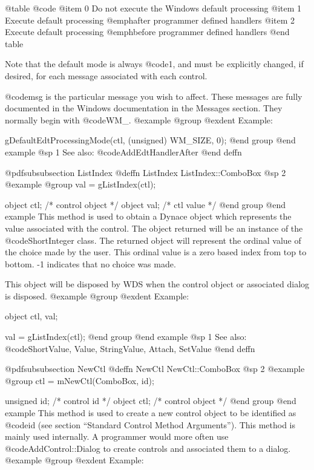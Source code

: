 @table @code
@item 0
Do not execute the Windows default processing
@item 1
Execute default processing @emph{after} programmer defined handlers
@item 2
Execute default processing @emph{before} programmer defined handlers
@end table

Note that the default mode is always @code{1}, and must be explicitly
changed, if desired, for each message associated with each control.

@code{msg} is the particular message you wish to affect.  These messages
are fully documented in the Windows documentation in the Messages
section.  They normally begin with @code{WM_}.
@example
@group
@exdent Example:

gDefaultEdtProcessingMode(ctl, (unsigned) WM_SIZE, 0);
@end group
@end example
@sp 1
See also:  @code{AddEdtHandlerAfter}
@end deffn

















@pdfsubsubsection {ListIndex}
@deffn {ListIndex} ListIndex::ComboBox
@sp 2
@example
@group
val = gListIndex(ctl);

object  ctl;   /*  control object  */
object  val;   /*  ctl value       */
@end group
@end example
This method is used to obtain a Dynace object which represents the value
associated with the control.  The object returned will be an instance of
the @code{ShortInteger} class.  The returned object will represent the
ordinal value of the choice made by the user.  This ordinal value is a
zero based index from top to bottom.  -1 indicates that no choice was
made.

This object will be disposed by WDS when the control object or
associated dialog is disposed.
@example
@group
@exdent Example:

object  ctl, val;

val = gListIndex(ctl);
@end group
@end example
@sp 1
See also:  @code{ShortValue, Value, StringValue, Attach, SetValue}
@end deffn




@pdfsubsubsection {NewCtl}
@deffn {NewCtl} NewCtl::ComboBox
@sp 2
@example
@group
ctl = mNewCtl(ComboBox, id);

unsigned  id;   /*  control id      */
object   ctl;   /*  control object  */
@end group
@end example
This method is used to create a new control object to be identified as
@code{id} (see section ``Standard Control Method Arguments'').  This
method is mainly used internally.  A programmer would more often
use @code{AddControl::Dialog} to create controls and associated them
to a dialog.
@example
@group
@exdent Example:

